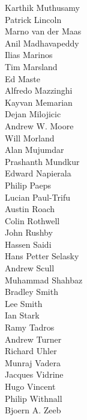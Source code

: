 \begin{small}
\begin{autogrid}{4}
Karthik Muthusamy \\
Patrick Lincoln \\
Marno van der Maas \\
Anil Madhavapeddy \\
Ilias Marinos \\
Tim Marsland \\
Ed Maste \\
Alfredo Mazzinghi \\
Kayvan Memarian \\
Dejan Milojicic \\
Andrew W. Moore \\
Will Morland \\
Alan Mujumdar \\
Prashanth Mundkur \\
Edward Napierala \\
Philip Paeps \\
Lucian Paul-Trifu \\
Austin Roach \\
Colin Rothwell \\
John Rushby \\
Hassen Saidi \\
Hans Petter Selasky \\
Andrew Scull \\
Muhammad Shahbaz \\
Bradley Smith \\
Lee Smith \\
Ian Stark \\
Ramy Tadros \\
Andrew Turner \\
Richard Uhler \\
Munraj Vadera \\
Jacques Vidrine \\
Hugo Vincent \\
Philip Withnall \\
Bjoern A. Zeeb \\
\end{autogrid}
\end{small}
